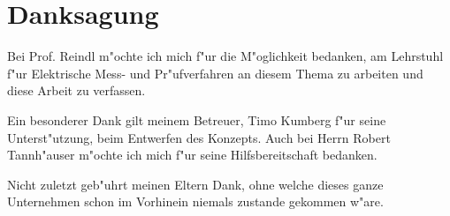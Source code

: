 
\chapter*{Danksagung}


Bei Prof. Reindl m"ochte ich mich f"ur die M"oglichkeit bedanken, am Lehrstuhl f"ur Elektrische Mess- und Pr"ufverfahren an diesem Thema zu arbeiten und diese Arbeit zu verfassen.

Ein besonderer Dank gilt meinem Betreuer, Timo Kumberg f"ur seine Unterst"utzung, beim Entwerfen des Konzepts. Auch bei Herrn Robert Tannh"auser m"ochte ich mich f"ur seine Hilfsbereitschaft bedanken.

Nicht zuletzt geb"uhrt meinen Eltern Dank, ohne welche dieses ganze Unternehmen schon im Vorhinein niemals zustande gekommen w"are.